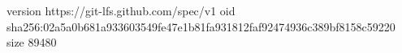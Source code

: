 version https://git-lfs.github.com/spec/v1
oid sha256:02a5a0b681a933603549fe47e1b81fa931812faf92474936c389bf8158c59220
size 89480
